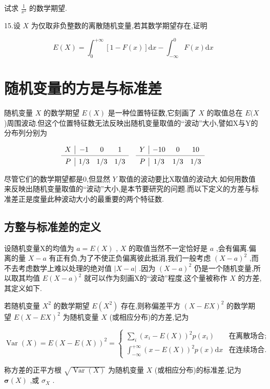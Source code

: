 试求 $ \frac{1}{x^{2}} $ 的数学期望.

15.设 $ X $ 为仅取非负整数的离散随机变量,若其数学期望存在,证明

\[
E(X)=\int_{0}^{+\infty}[1-F(x)] \mathrm{d} x-\int_{-\infty}^{0} F(x) \mathrm{d} x
\]

\section{随机变量的方是与标准差}


随机变量 $ X $ 的数学期望 $ E(X) $ 是一种位置特征数,它刻画了 $ X $ 的取值总在 $ E(X $ )周围波动.但这个位置特征数无法反映出随机变量取值的“波动”大小,譬如X与Y的分布列分别为

\[
\begin{array}{c|ccccc|ccc}
X     & -1    & 0     & 1     &       & Y     & -10   & 0     & 10 \\
\cmidrule{1-4}\cmidrule{6-9}    P     & 1/3   & 1/3   & 1/3   &       & P     & 1/3   & 1/3   & 1/3 \\
\end{array}\]

尽管它们的数学期望都是0,但显然 $ Y $ 取值的波动要比X取值的波动大.如何用数值来反映出随机变量取值的“波动”大小,是本节要研究的问题.而以下定义的方差与标准差正是度量此种波动大小的最重要的两个特征数.

\subsection{方整与标准差的定义}

设随机变量X的均值为 $ a=E(X) $ , $ X $ 的取值当然不一定恰好是 $ a $ ,会有偏离.偏离的量 $ X-a $ 有正有负,为了不使正负偏离彼此抵消,我们一般考虑 $ (X-a)^2 $ ,而不去考虑数学上难以处理的绝对值 $ |X-a| $ .因为 $ (X-a)^2 $ 仍是一个随机变量,所以取其均值 $ E(X-a)^2 $ 就可以作为刻画X的“波动”程度,这个量被称作 $ X $ 的方差,其定义如下.
\begin{definition}{}{}
	若随机变量 $ X^2 $ 的数学期望 $ E(X^2) $ 存在,则称偏差平方 $ (X-EX)^2 $ 的数学期望 $ E(X-EX)^2 $ 为随机变量 $ X $ (或相应分布)的方差,记为
	
	\begin{equation}
	\operatorname{Var}(X)=E(X-E(X))^{2}=\left\{\begin{array}{ll}
	{\sum_{i}\left(x_{i}-E(X)\right)^{2} p\left(x_{i}\right)} &{\text{在离散场合;}}\\
	{\int_{-\infty}^{+\infty}(x-E(X))^{2} p(x) \mathrm{d} x} &{\text{在连续场合.}}
	\end{array}\right. \label{eq:2.3.1}
	\end{equation}
	
	称方差的正平方根 $ \sqrt{\operatorname{Var}(X)} $ 为随机变量 $ X $ (或相应分布)的标准差,记为 $ \boldsymbol{\sigma}(X) $ ,或 $ \sigma_X $ .
\end{definition}



